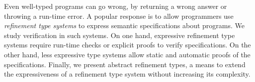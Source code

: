 Even well-typed programs can go wrong,
by returning a wrong answer or 
throwing a run-time error.
A popular response is
to allow programmers use
\textit{refinement type systems}
to express semantic specifications 
about programs.
%
We study verification in such systems.
%
On one hand, expressive refinement type systems
require run-time checks
or explicit proofs to verify specifications.
On the other hand,
less expressive type systems
allow static and automatic proofs of the specifications.
%
Finally, we present abstract refinement types, 
a means to extend the expressiveness of
a refinement type system without increasing its complexity.